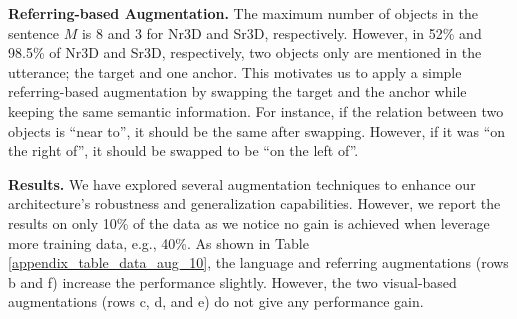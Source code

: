 \noindent \textbf{Referring-based Augmentation.}
The maximum number of objects in the sentence $M$ is 8 and 3 for Nr3D and Sr3D, respectively.
However, in 52\% and 98.5\% of Nr3D and Sr3D, respectively, two objects only are mentioned in the utterance; the target and one anchor.
This motivates us to apply a simple referring-based augmentation by swapping the target and the anchor while keeping the same semantic information.
For instance, if the relation between two objects is ``near to'', it should be the same after swapping.
However, if it was ``on the right of'', it should be swapped to be ``on the left of''.


\noindent \textbf{Results.}
We have explored several augmentation techniques to enhance our architecture's robustness and generalization capabilities.
However, we report the results on only 10\% of the data as we notice no gain is achieved when leverage more training data, e.g., 40\%.
As shown in Table \ref{appendix_table_data_aug_10}, the language and referring augmentations (rows b and f) increase the performance slightly.
However, the two visual-based augmentations (rows c, d, and e) do not give any performance gain.

